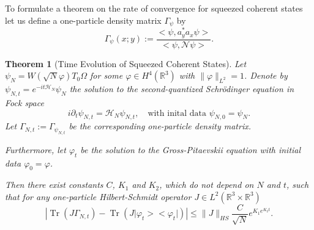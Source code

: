 \documentclass[11pt,a4paper,draft,DIV11]{scrartcl}	%
\newtheorem{thm}{Theorem}[section]
\newcommand{\Ncal}{\mathcal{N}}		%
\newcommand{\Hcal}{\mathcal{H}}		%
\newcommand{\scal}[2]{\big<#1,#2\big>} %
\newcommand{\Rbb}{\mathbb{R}}		%
\newcommand{\norm}[1]{\lVert#1\rVert}	%
\newcommand{\project}[1]{\lvert #1 \big>\big< #1\rvert}	%
\newcommand{\Tr}{\operatorname{Tr}}	%
\newcommand{\bd}{\begin{displaymath}}			%
\newcommand{\ed}{\end{displaymath}}
\begin{document}
To formulate a theorem on the rate of convergence for squeezed coherent states let us define a one-particle density matrix $\Gamma_\psi$ by
\[\Gamma_{\psi}(x;y) := \frac{\scal{\psi}{a^\ast_y a_x \psi}}{\scal{\psi}{\Ncal \psi}}.\]
\begin{thm}[Time Evolution of Squeezed Coherent States] \label{thm:main_squeezed}
 Let $\psi_{N} = W(\sqrt{N} \varphi) T_0 \Omega$ for some $\varphi \in H^4(\Rbb^3)$ with $\norm{\varphi}_{L^2} = 1$. Denote by $\psi_{N,t} = e^{-it \Hcal_N}\psi_N$ the solution to the second-quantized Schr\"odinger equation in Fock space
\[i \partial_t \psi_{N,t} = \Hcal_N \psi_{N,t},\quad \mbox{with inital data } \psi_{N,0} = \psi_N.\]
Let $\Gamma_{N,t} := \Gamma_{\psi_{N,t}}$ be the corresponding one-particle density matrix.

 Furthermore, let $\varphi_t$ be the solution to the Gross-Pitaevskii equation with initial data $\varphi_0 = \varphi$.

 Then there exist constants $C$, $K_1$ and $K_2$, which do not depend on $N$ and $t$, such that for any one-particle Hilbert-Schmidt operator $J \in L^2(\Rbb^3 \times \Rbb^3)$
\bd
\left\lvert \Tr\left(J \Gamma_{N,t} \right) - \Tr\left( J \project{\varphi_t}  \right) \right\rvert \leq \norm{J}_{HS} \frac{C}{\sqrt{N}}e^{K_1 e^{K_2 t}}.
\ed
\end{thm}
\end{document}
